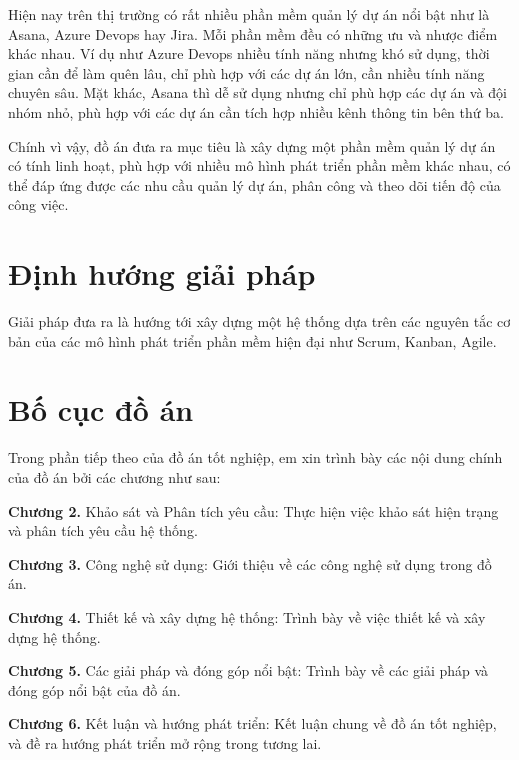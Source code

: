 \documentclass[../DoAn.tex]{subfiles}
\begin{document}
Hiện nay trên thị trường có rất nhiều phần mềm quản lý dự án nổi bật như là Asana, Azure Devops hay Jira. Mỗi phần mềm đều có những ưu và nhược điểm khác nhau.
Ví dụ như Azure Devops nhiều tính năng nhưng khó sử dụng, thời gian cần để làm quên lâu, chỉ phù hợp với các dự án lớn, cần nhiều tính năng chuyên sâu.
Mặt khác, Asana thì dễ sử dụng nhưng chỉ phù hợp các dự án và đội nhóm nhỏ, phù hợp với các dự án cần tích hợp nhiều kênh thông tin bên thứ ba.

Chính vì vậy, đồ án đưa ra mục tiêu là xây dựng một phần mềm quản lý dự án có tính linh hoạt, phù hợp với nhiều mô hình phát triển phần mềm khác nhau, có thể đáp ứng được các nhu cầu quản lý dự án,
phân công và theo dõi tiến độ của công việc.

\section{Định hướng giải pháp}
\label{section:1.3}

Giải pháp đưa ra là hướng tới xây dựng một hệ thống dựa trên các nguyên tắc cơ bản của các mô hình phát triển phần mềm hiện đại như Scrum, Kanban, Agile.

\section{Bố cục đồ án}
\label{section:1.4}

Trong phần tiếp theo của đồ án tốt nghiệp, em xin trình bày các nội dung chính của đồ án bởi các chương như sau:

\textbf{Chương 2.} Khảo sát và Phân tích yêu cầu: Thực hiện việc khảo sát hiện trạng và phân tích yêu cầu hệ thống.

\textbf{Chương 3.} Công nghệ sử dụng: Giới thiệu về các công nghệ sử dụng trong đồ án.

\textbf{Chương 4.} Thiết kế và xây dựng hệ thống: Trình bày về việc thiết kế và xây dựng hệ thống.

\textbf{Chương 5.} Các giải pháp và đóng góp nổi bật: Trình bày về các giải pháp và đóng góp nổi bật của đồ án.

\textbf{Chương 6.} Kết luận và hướng phát triển: Kết luận chung về đồ án tốt nghiệp, và đề ra hướng phát triển mở rộng trong tương lai.
\end{document}
